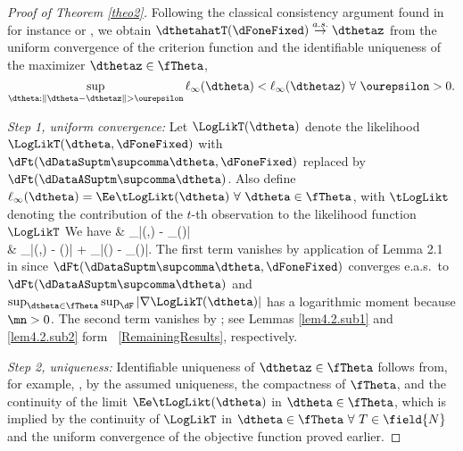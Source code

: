 \proofskip
\begin{proof}[Proof of Theorem \ref{theo2}]
Following the classical consistency argument found 
in for instance \citet[Theorem 3.4]{RePEc:cup:cbooks:9780521252805} or 
\citet[Theorem 3.3]{galwhitbook},
we obtain $\dthetahatT(\dFoneFixed) \stackrel{a.s.}{\to} \dthetaz$ from the uniform convergence of the criterion function
and the identifiable uniqueness of the maximizer $\dthetaz \in \fTheta$,
\begin{equation*}
\sup_{\dtheta: \| \dtheta - \dthetaz \| > \ourepsilon} \ell_{\infty}(\dtheta) < \ell_{\infty}
(\dthetaz) \ \forall \ \ourepsilon >0. 
\end{equation*} 

\textit{Step 1, uniform convergence:}
Let $\LogLikT(\dtheta)$ denote the likelihood $\LogLikT(\dtheta,\dFoneFixed)$ with 
$\dFt(\dDataSuptm\supcomma\dtheta,\dFoneFixed)$
replaced by
$\dFt(\dDataASuptm\supcomma\dtheta)$.
Also define
$ \ell_{\infty}(\dtheta)  = \Ee \tLogLikt(\dtheta) \ \forall \ \dtheta \in \fTheta$,
with $\tLogLikt$ denoting the contribution of the $t$-th observation to the 
likelihood function $\LogLikT$
We have
\bqn
\nonumber
&   \sup_{\dtheta \in \fTheta}|\LogLikT(\dtheta,\dFoneFixed) -  \ell_{\infty}(\dtheta)| \ \leq 
\\ &
\label{ineqsRao}
    \sup_{\dtheta \in \fTheta}|\LogLikT(\dtheta,\dFoneFixed) -  \LogLikT(\dtheta)| +
    \sup_{\dtheta \in \fTheta}|\LogLikT(\dtheta) -  \ell_{\infty}(\dtheta)|.
\eqn
The first term vanishes by application of Lemma 2.1 in \cite{smikosch2006} since  
$\dFt(\dDataSuptm\supcomma\dtheta,\dFoneFixed)$
converges e.a.s.~to 
$\dFt(\dDataASuptm\supcomma\dtheta)$
and $\sup_{\dtheta \in \fTheta} \sup_{\dF}|\nabla \LogLikT(\dtheta)|$ has a logarithmic moment because $\mn>0$. The second term vanishes by
 \citet{rao1962}; see Lemmas \ref{lem4.2.sub1} and \ref{lem4.2.sub2} form \SupplementaryAppendix\ \ref{RemainingResults}, respectively.


\textit{Step 2, uniqueness:}
Identifiable uniqueness of $\dthetaz \in \fTheta$ follows 
from, for example, \citet{RePEc:cup:cbooks:9780521252805},
by the assumed uniqueness, 
the compactness of $\fTheta$, 
and the continuity of the limit $\Ee\tLogLikt(\dtheta)$ in 
$\dtheta \in \fTheta$, which is implied by the continuity of 
$\LogLikT$ in $\dtheta \in \fTheta \ \forall \ T \in \field{N}$ 
and the uniform convergence of the objective function proved earlier.
\end{proof}

